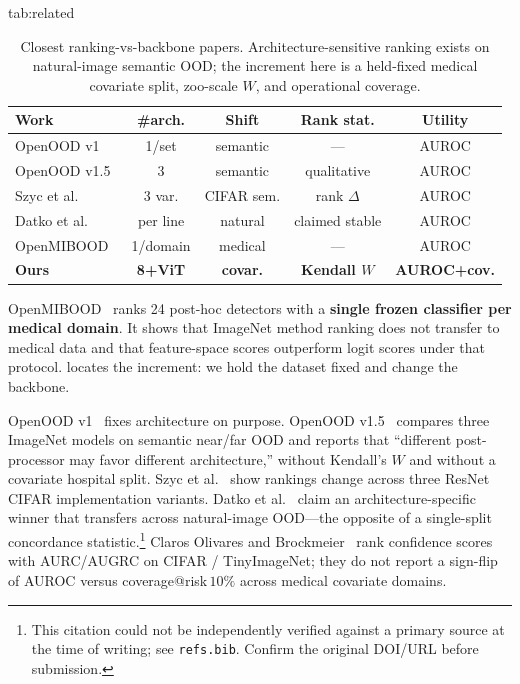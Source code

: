 \documentclass[anon]{midl}
\newcommand{\etal}{et al.}
\begin{document}
\begin{table}[t]
\floatconts
  {tab:related}
  {\caption{Closest ranking-vs-backbone papers. Architecture-sensitive ranking exists on natural-image semantic OOD; the increment here is a held-fixed medical covariate split, zoo-scale $W$, and operational coverage.}}
  {\small
  \begin{tabular}{@{}lcccc@{}}
  \toprule
  Work & \#arch. & Shift & Rank stat. & Utility \\
  \midrule
  OpenOOD v1~\cite{yang2022openood} & 1/set & semantic & --- & AUROC \\
  OpenOOD v1.5~\cite{zhang2023openoodv15} & 3 & semantic & qualitative & AUROC \\
  Szyc \etal~\cite{szyc2023uai} & 3 var. & CIFAR sem. & rank $\Delta$ & AUROC \\
  Datko \etal~\cite{datko2026eswa} & per line & natural & claimed stable & AUROC \\
  OpenMIBOOD~\cite{openmibood2025} & 1/domain & medical & --- & AUROC \\
  \textbf{Ours} & \textbf{8+ViT} & \textbf{covar.} & \textbf{Kendall $W$} & \textbf{AUROC+cov.} \\
  \bottomrule
  \end{tabular}}
\end{table}

OpenMIBOOD~\cite{openmibood2025} ranks 24 post-hoc detectors with a \textbf{single frozen classifier per medical domain}.
It shows that ImageNet method ranking does not transfer to medical data and that feature-space scores outperform logit scores under that protocol.
 locates the increment: we hold the dataset fixed and change the backbone.

OpenOOD v1~\cite{yang2022openood} fixes architecture on purpose.
OpenOOD v1.5~\cite{zhang2023openoodv15} compares three ImageNet models on semantic near/far OOD and reports that ``different post-processor may favor different architecture,'' without Kendall's $W$ and without a covariate hospital split.
Szyc \etal~\cite{szyc2023uai} show rankings change across three ResNet CIFAR implementation variants.
Datko \etal~\cite{datko2026eswa} claim an architecture-specific winner that transfers across natural-image OOD---the opposite of a single-split concordance statistic.\footnote{This citation could not be independently verified against a primary source at the time of writing; see \texttt{refs.bib}. Confirm the original DOI/URL before submission.}
Claros Olivares and Brockmeier~\cite{claros2025arxiv} rank confidence scores with AURC/AUGRC on CIFAR / TinyImageNet; they do not report a sign-flip of AUROC versus coverage@risk\,$10\%$ across medical covariate domains.
\end{document}
